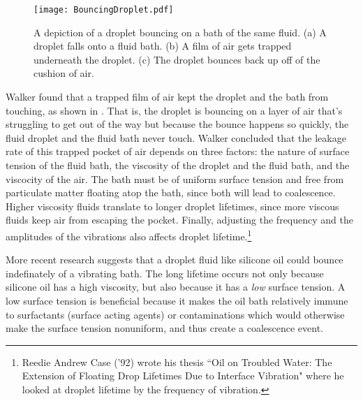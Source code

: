 \begin{figure}[h!]
	\centering
	\texttt{[image: BouncingDroplet.pdf]}
	\caption{A depiction of a droplet bouncing on a bath of the same fluid. (a) A droplet falls onto a fluid bath. (b) A film of air gets trapped underneath the droplet. (c) The droplet bounces back up off of the cushion of air.}
	\label{bounce}
\end{figure}
	    
	    Walker found that a trapped film of air kept the droplet and the bath from touching, as shown in . That is, the droplet is bouncing on a layer of air that's struggling to get out of the way but because the bounce happens so quickly, the fluid droplet and the fluid bath never touch. Walker concluded that the leakage rate of this trapped pocket of air depends on three factors: the nature of surface tension of the fluid bath, the viscosity of the droplet and the fluid bath, and the viscocity of the air. The bath must be of uniform surface tension and free from particulate matter floating atop the bath, since both will lead to coalescence. Higher viscosity fluids translate to longer droplet lifetimes, since more viscous fluids keep air from escaping the pocket. Finally, adjusting the frequency and the amplitudes of the vibrations also affects droplet lifetime.\footnote{Reedie Andrew Case ('92) wrote his thesis ``Oil on Troubled Water: The Extension of Floating Drop Lifetimes Due to Interface Vibration" where he looked at droplet lifetime by the frequency of vibration.}   
	     
	    More recent research suggests that a droplet fluid like silicone oil could bounce indefinately of a vibrating bath. The long lifetime occurs not only because silicone oil has a high viscosity, but also because it has a \textit{low} surface tension. A low surface tension is beneficial because it makes the oil bath relatively immune to surfactants (surface acting agents) or contaminations which would otherwise make the surface tension nonuniform, and thus create a coalescence event. 

